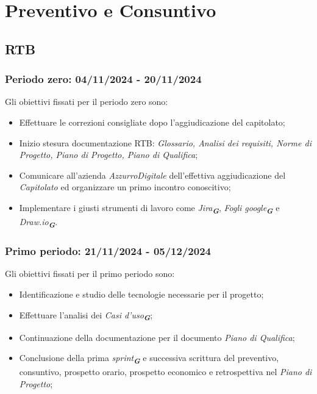 
\section{Preventivo e Consuntivo}
\label{sec:preventivo e consuntivo}

\subsection{RTB}
\subsubsection{Periodo zero: 04/11/2024 - 20/11/2024}
Gli obiettivi fissati per il periodo zero sono:
\begin{itemize}
    \item Effettuare le correzioni consigliate dopo l'aggiudicazione del capitolato;
    \item Inizio stesura documentazione RTB: \textit{Glossario, Analisi dei requisiti, Norme di Progetto, Piano di Progetto, Piano di Qualifica};
    \item Comunicare all'azienda \emph{AzzurroDigitale} dell'effettiva aggiudicazione del \textit{Capitolato} ed organizzare un primo incontro conoscitivo;
    \item Implementare i giusti strumenti di lavoro come {\emph{Jira}}\textsubscript{\textit{\textbf{G}}}, {\emph{Fogli google}}\textsubscript{\textit{\textbf{G}}} e {\emph{Draw.io}}\textsubscript{\textit{\textbf{G}}}.
\end{itemize}

\subsubsection{Primo periodo: 21/11/2024 - 05/12/2024}
Gli obiettivi fissati per il primo periodo sono:
\begin{itemize}
    \item Identificazione e studio delle tecnologie necessarie per il progetto;
    \item Effettuare l'analisi dei {\emph{Casi d'uso}}\textsubscript{\textit{\textbf{G}}};
    \item Continuazione della documentazione per il documento \textit{Piano di Qualifica};
    \item Conclusione della prima {\emph{sprint}}\textsubscript{\textit{\textbf{G}}} e successiva scrittura del preventivo, consuntivo, prospetto orario, prospetto economico e retrospettiva nel \textit{Piano di Progetto};
\end{itemize}

